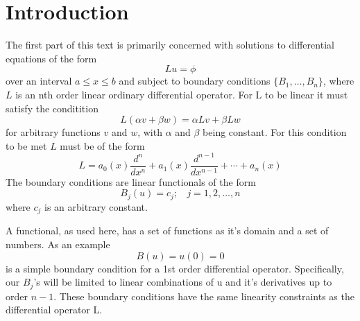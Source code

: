 \section{Introduction}
The first part of this text is primarily concerned with solutions to differential equations of the form
\begin{equation}
    Lu=\phi
\end{equation}
over an interval \(a \leq x \leq b\) and subject to boundary conditions \( \{ B_1, \dots ,B_n \} \), where \(L\) is an nth order linear ordinary differential operator.  For L to be linear it must satisfy the conditition
\begin{equation}
	L(\alpha v + \beta w) = \alpha Lv + \beta Lw
\end{equation}
for arbitrary functions \(v\) and \(w\), with \(\alpha\) and \(\beta\) being constant. For this condition to be met \(L\) must be of the form
\begin{equation} 
	L = a_0(x) \frac{d^n}{dx^n} + a_1(x) \frac{d^{n-1}}{dx^{n-1}} + \cdots + a_n(x)
\end{equation}
The boundary conditions are linear functionals of the form 
\begin{equation}
	B_j (u) = c_j;~~~~ j=1,2,\dots,n
\end{equation}
where \(c_j\) is an arbitrary constant. 

A functional, as used here, has a set of functions as it's domain and a set of numbers. As an example
\begin{equation}
	B (u) = u(0) = 0
\end{equation}
is a simple boundary condition for a 1st order differential operator. Specifically, our \(B_j\)'s will be limited to linear combinations of u and it's derivatives up to order \(n-1\). These boundary conditions have the same linearity constraints as the differential operator L. 

